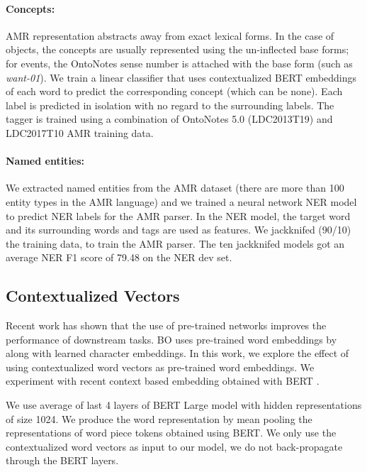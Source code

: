 \documentclass[11pt,a4paper]{article}
\begin{document}
\paragraph{Concepts:} AMR representation abstracts away from exact lexical forms. In the case of objects, the concepts are usually represented using the un-inflected base forms; for events, the OntoNotes sense number is attached with the base form (such as \emph{want-01}). We train a linear classifier that uses contextualized BERT embeddings \cite{devlin2018bert} of each word to predict the corresponding concept (which can be none). Each label is predicted in isolation with no regard to the surrounding labels. The tagger is trained using a combination of OntoNotes 5.0 (LDC2013T19) and LDC2017T10 AMR training data.




\paragraph{Named entities:} We extracted named entities from the AMR dataset (there are more than 100 entity types in the AMR language) and we trained a neural network NER model \cite{ni-dinu-florian:2017:Long} to predict NER labels for the AMR parser. In the NER model, the target word and its surrounding words and tags are used as features. We jackknifed (90/10) the training data, to train the AMR parser. The ten jackknifed models got an average NER F1 score of 79.48 on the NER dev set.

\subsection{Contextualized Vectors}

Recent work has shown that the use of pre-trained networks improves the performance of downstream tasks. BO uses pre-trained word embeddings by  along with learned character embeddings. In this work, we explore the effect of using contextualized word vectors as pre-trained word embeddings. We experiment with recent context based embedding obtained with BERT \cite{devlin2018bert}. 



We use average of last 4 layers of BERT Large model with hidden representations of size 1024. We produce the word representation by mean pooling the representations of word piece tokens obtained using BERT. We only use the contextualized word vectors as input to our model, we do not back-propagate through the BERT layers. 
\end{document}
